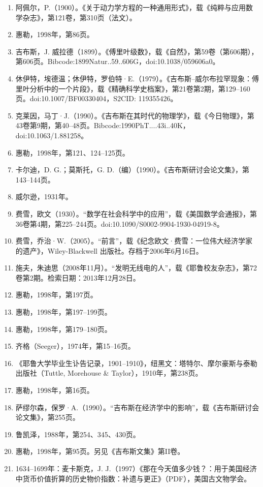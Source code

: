 \begin{enumerate}
\item 阿佩尔，P.（1900）。《关于动力学方程的一种通用形式》，载《纯粹与应用数学杂志》，第121卷，第310页（法文）。
\item 惠勒，1998年，第86页。
\item 吉布斯，J. 威拉德（1899）。《傅里叶级数》，载《自然》，第59卷（第606期），第606页。Bibcode:1899Natur..59..606G，doi:10.1038/059606a0。
\item 休伊特，埃德温；休伊特，罗伯特·E.（1979）。《吉布斯–威尔布拉罕现象：傅里叶分析中的一个片段》，载《精确科学史档案》，第21卷第2期，第129–160页。doi:10.1007/BF00330404，S2CID: 119355426。
\item 克莱因，马丁·J.（1990）。《吉布斯在其时代的物理学》，载《今日物理》，第43卷第9期，第40–48页。Bibcode:1990PhT....43i..40K，doi:10.1063/1.881258。
\item 惠勒，1998年，第121、124–125页。
\item 卡尔迪，D. G.；莫斯托，G. D.（编）（1990）。《吉布斯研讨会论文集》，第143–144页。
\item 威尔逊，1931年。
\item 费雪，欧文（1930）。“数学在社会科学中的应用”，载《美国数学会通报》，第36卷第4期，第225–244页。doi:10.1090/S0002-9904-1930-04919-8。
\item 费雪，乔治·W.（2005）。“前言”，载《纪念欧文·费雪：一位伟大经济学家的遗产》，Wiley-Blackwell 出版社。存档于2006年6月16日。
\item 施夫，朱迪思（2008年11月）。“发明无线电的人”，载《耶鲁校友杂志》，第72卷第2期。检索日期：2013年12月28日。
\item 惠勒，1998年，第197页。
\item 惠勒，1998年，第197–199页。
\item 惠勒，1998年，第179–180页。
\item 齐格（Seeger），1974年，第15–16页。
\item 《耶鲁大学毕业生讣告记录，1901–1910》，纽黑文：塔特尔、摩尔豪斯与泰勒出版社（Tuttle, Morehouse & Taylor），1910年，第238页。
\item 惠勒，1998年，第16页。
\item 萨缪尔森，保罗·A.（1990）。“吉布斯在经济学中的影响”，载《吉布斯研讨会论文集》，第255页。
\item 鲁凯泽，1988年，第254、345、430页。
\item 惠勒，1998年，第95页。另见《吉布斯文集》第II卷。
\item 1634–1699年：麦卡斯克，J. J.（1997）《那在今天值多少钱？：用于美国经济中货币价值折算的历史物价指数：补遗与更正》（PDF），美国古文物学会。

\end{enumerate}
